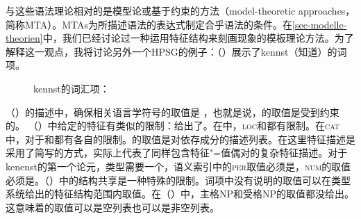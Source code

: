 与这些语法理论相对的是模型论或基于约束的方法（model-theoretic approaches，简称MTA）。MTAs为所描述语法的表达式制定合乎语法的条件。在\ref{sec-modelle-theorien}中，我们已经讨论过一种运用特征结构来刻画现象的模板理论方法。为了解释这一观点，我将讨论另外一个HPSG的例子：（）展示了kennst（知道）的词项。
\begin{figure}
\eas
kennst的词汇项：\\
\label{le-kennst-mts}%
\zs
\vspace{-\baselineskip}
\end{figure}
（）的描述中，确保相关语言学符号的\phonvc 取值是 ，也就是说，\phonc 的取值是受到约束的。 （）中给定的特征有类似的限制：给出了\synsemvc。在\synsemc 中，\textsc{loc}和\nonlocvc 都有限制。在\textsc{cat}中，对于\headc 和\subcatc 都有各自的限制。\subcatc 的取值是对依存成分的描述列表。在这里特征描述是采用了简写的方式，实际上代表了同样包含特征"=值偶对的复杂特征描述。对于kenenst的第一个论元，类型需要一个\headvc，语义索引中的\textsc{per}取值必须是，\textsc{num}的取值必须是。（）中的结构共享是一种特殊的限制。词项中没有说明的取值可以在类型系统给出的特征结构范围内取值。在（）中，主格NP和受格NP的\slashvc 取值都没给出。这意味着\slaschc 的取值可以是空列表也可以是非空列表。
